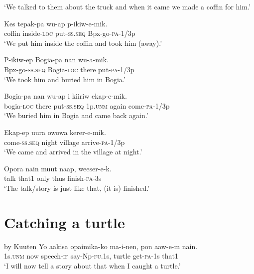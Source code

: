 \glt ‘We talked to them about the truck and when it came we made a coffin for him.’ \\
\z


\ea\label{ex:a:x60}
\gll  Kes  tepak-pa  wu-ap  p-ikiw-e-mik. \\
coffin  inside-\textsc{loc}  put-\textsc{ss.seq}  Bpx-go-\textsc{pa}-1/3p \\
\glt ‘We put him inside the coffin and took him (away).’ \\
\z


\ea\label{ex:a:x61}
\gll  P-ikiw-ep  Bogia-pa  nan  wu-a-mik. \\
Bpx-go-\textsc{ss.seq}  Bogia-\textsc{loc}  there  put-\textsc{pa}-1/3p \\
\glt ‘We took him and buried him in Bogia.’ \\
\z


\ea\label{ex:a:x62}
\gll  Bogia-pa  nan  wu-ap  i  kiiriw  ekap-e-mik. \\
bogia-\textsc{loc}  there  put-\textsc{ss.seq}  1p.\textsc{unm}  again  come-\textsc{pa}-1/3p \\
\glt ‘We buried him in Bogia and came back again.’ \\
\z


\ea\label{ex:a:x63}
\gll  Ekap-ep  uura  owowa  kerer-e-mik. \\
come-\textsc{ss.seq}  night  village  arrive-\textsc{pa}-1/3p \\
\glt ‘We came and arrived in the village at night.’ \\
\z


\ea\label{ex:a:x64}
\gll  Opora  nain  muut  naap,  weeser-e-k. \\
talk  that1  only  thus  finish-\textsc{pa}-3s \\
\glt ‘The talk/story is just like that, (it is) finished.’ \\
\z


\setcounter{equation}{0}
\section{Catching a turtle} 
 by Kuuten  
\ea\label{ex:a:x1}
\gll  Yo  aakisa  opaimika-ko  ma-i-nen,  pon  aaw-e-m  nain. \\
1s.\textsc{unm}  now  speech-\textsc{if}  say-Np-\textsc{fu}.1s,  turtle  get-\textsc{pa}-1s  that1 \\
\glt ‘I will now tell a story about that when I caught a turtle.’ \\
\z


